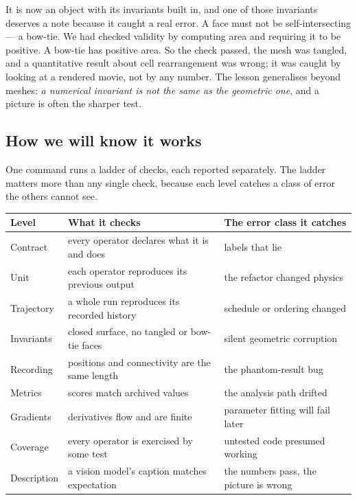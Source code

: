 \documentclass[11pt]{article}
\begin{document}
It is now an object with its invariants built in, and one of those invariants deserves a note
because it caught a real error. A face must not be self-intersecting --- a bow-tie. We had
checked validity by computing area and requiring it to be positive. A bow-tie has positive area.
So the check passed, the mesh was tangled, and a quantitative result about cell rearrangement
was wrong; it was caught by looking at a rendered movie, not by any number. The lesson
generalises beyond meshes: \emph{a numerical invariant is not the same as the geometric one},
and a picture is often the sharper test.

\subsection{How we will know it works}

One command runs a ladder of checks, each reported separately. The ladder matters more than any
single check, because each level catches a class of error the others cannot see.

\begin{center}
\small
\begin{tabular}{@{}lll@{}}
\toprule
\textbf{Level} & \textbf{What it checks} & \textbf{The error class it catches} \\
\midrule
Contract      & every operator declares what it is and does & labels that lie \\
Unit          & each operator reproduces its previous output & the refactor changed physics \\
Trajectory    & a whole run reproduces its recorded history & schedule or ordering changed \\
Invariants    & closed surface, no tangled or bow-tie faces & silent geometric corruption \\
Recording     & positions and connectivity are the same length & the phantom-result bug \\
Metrics       & scores match archived values & the analysis path drifted \\
Gradients     & derivatives flow and are finite & parameter fitting will fail later \\
Coverage      & every operator is exercised by some test & untested code presumed working \\
Description   & a vision model's caption matches expectation & the numbers pass, the picture is wrong \\
\bottomrule
\end{tabular}
\end{center}
\end{document}
